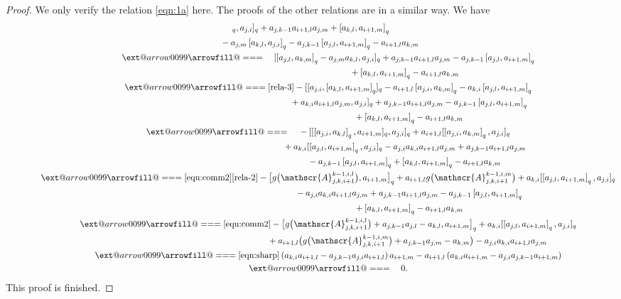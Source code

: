 \documentclass[10pt,a4paper]{amsart}
\makeatletter
\def\x@arrow{\DOTSB\Relbar}
\def\xlongequalsignfill@{\arrowfill@\x@arrow\Relbar\x@arrow}
\providecommand{\xlongequal}[2][]{%
	\ext@arrow 0099\xlongequalsignfill@{#1}{#2}}
\numberwithin{equation}{section}
\def\lr#1{\left[#1\right]}
\def\lrb#1{\left(#1\right)}
\def\A{\mathscr{A}}
\makeatother
\begin{document}
\begin{proof}
We only verify the relation \eqref{eqn:1a} here.
The proofs of the other relations are in a similar way.
We have
\begin{gather*}
 [\lr{a_{j,l},a_{k,m}}_q,a_{j,i}]_q +a_{j,k-1}a_{i+1,l}a_{j,m} +\lr{a_{k,l},a_{i+1,m}}_q \\
 \qquad {}-a_{j,m}\lr{a_{k,l},a_{j,i}}_q-a_{j,k-1}\lr{a_{j,l},a_{i+1,m}}_q-a_{i+1,l}a_{k,m} \\
\qquad\qquad \xlongequal{\quad} [\lr{a_{j,l},a_{k,m}}_q-a_{j,m}a_{k,l},a_{j,i}]_q +a_{j,k-1}a_{i+1,l}a_{j,m} -a_{j,k-1}\lr{a_{j,l},a_{i+1,m}}_q\\
 \phantom{\qquad\qquad\xlongequal{\quad}}{} +\lr{a_{k,l},a_{i+1,m}}_q -a_{i+1,l}a_{k,m} \\
\qquad\qquad \xlongequal{\eqref{rela-3}} {}-[[a_{j,i},\lr{a_{k,l},a_{i+1,m}}_q ]_q -a_{i+1,l}\lr{a_{j,i},a_{k,m} }_q -a_{k,i}\lr{a_{j,l},a_{i+1,m}}_q\\
 \phantom{\qquad\qquad\xlongequal{\qquad}}{}+a_{k,i}a_{i+1,l}a_{j,m},
 a_{j,i}]_q +a_{j,k-1}a_{i+1,l}a_{j,m} -a_{j,k-1}\lr{a_{j,l},a_{i+1,m}}_q\\
 \phantom{\qquad\qquad\xlongequal{\qquad}}{}
 +\lr{a_{k,l},a_{i+1,m}}_q -a_{i+1,l}a_{k,m} \\
\qquad\qquad \xlongequal{\quad} -[[\lr{a_{j,i},a_{k,l}}_q,a_{i+1,m} ]_q,a_{j,i}]_q +a_{i+1,l}[\lr{a_{j,i},a_{k,m}}_q, a_{j,i}]_q \\
 \phantom{\qquad\qquad\xlongequal{\quad}}{}+a_{k,i}[\lr{a_{j,l},a_{i+1,m}}_q, a_{j,i}]_q -a_{j,i}a_{k,i}a_{i+1,l}a_{j,m}+a_{j,k-1}a_{i+1,l}a_{j,m} \\
 \phantom{\qquad\qquad\xlongequal{\quad}}{}-a_{j,k-1}\lr{a_{j,l},a_{i+1,m}}_q+\lr{a_{k,l},a_{i+1,m}}_q -a_{i+1,l}a_{k,m} \\
 \qquad\qquad \xlongequal[\eqref{equ:comm2}]{\eqref{rela-2}} -\bigl[g\bigl(\A_{j,k,i+1}^{k-1,i,l}\bigr),a_{i+1,m}\bigr]_q +a_{i+1,l}g\bigl(\A_{j,k,i+1}^{k-1,i,m}\bigr) +a_{k,i}[\lr{a_{j,l},a_{i+1,m}}_q, a_{j,i}]_q \\
 \phantom{\qquad\qquad\xlongequal{\qquad}}{} -a_{j,i}a_{k,i}a_{i+1,l}a_{j,m} +a_{j,k-1}a_{i+1,l}a_{j,m} -a_{j,k-1}\lr{a_{j,l},a_{i+1,m}}_q\\
 \phantom{\qquad\qquad\xlongequal{\qquad}}{} +\lr{a_{k,l},a_{i+1,m}}_q -a_{i+1,l}a_{k,m} \\
 \qquad\qquad \xlongequal{\eqref{equ:comm2}} -\bigl[g\bigl(\A_{j,k,i+1}^{k-1,i,l}\bigr)+a_{j,k-1}a_{j,l}-a_{k,l},a_{i+1,m}\bigr]_q +a_{k,i}[\lr{a_{j,l},a_{i+1,m}}_q, a_{j,i}]_q \\
 \phantom{\qquad\qquad\xlongequal{\qquad}\!\! }{} +a_{i+1,l}\bigl(g\bigl(\A_{j,k,i+1}^{k-1,i,m}\bigr) +a_{j,k-1}a_{j,m}-a_{k,m}\bigr) -a_{j,i}a_{k,i}a_{i+1,l}a_{j,m} \\
 \qquad\qquad \xlongequal{\eqref{eqn:sharp}} \lrb{a_{k,i}a_{i+1,l} -a_{j,k-1}a_{j,i}a_{i+1,l}}a_{i+1,m} -a_{i+1,l}\lrb{a_{k,i}a_{i+1,m} -a_{j,i}a_{j,k-1}a_{i+1,m}}\\
 \qquad\qquad \xlongequal{\quad} 0.
\end{gather*}
This proof is finished.
\end{proof}
\end{document}
